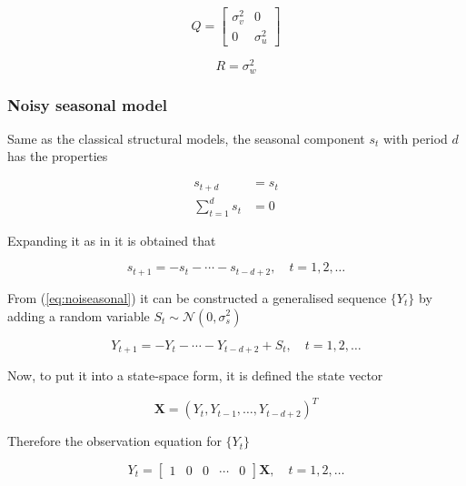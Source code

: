\begin{equation}
  Q = \begin{bmatrix}
  		\sigma^2_v 	& 0 \\
  		0 			& \sigma^2_u 
  \end{bmatrix}
\end{equation}

\begin{equation}
  R = \sigma^2_w
\end{equation}

\subsubsection*{Noisy seasonal model}

Same as the classical structural models, the seasonal component $s_t$ with period $d$ has the properties\cite{maravall1985structural}

\begin{align*}
	s_{t+d} &= s_t \\
	\sum_{t=1}^{d}{s_t} &= 0
\end{align*}

Expanding it as in \cite{brockwell2016introduction} it is obtained that

\begin{equation}\label{eq:noiseasonal}
	s_{t+1} = -s_t - \cdots - s_{t-d+2}, \quad t=1,2,\ldots
\end{equation}

From (\ref{eq:noiseasonal}) it can be constructed a generalised sequence $\{Y_t\}$ by adding a random variable $S_t \sim \mathcal{N}(0, \sigma^2_s)$

\begin{equation}
	Y_{t+1} = -Y_t - \cdots - Y_{t-d+2} + S_t, \quad t=1,2,\ldots
\end{equation} 

Now, to put it into a state-space form, it is defined the state vector

\begin{equation}
	\bm{X} = (Y_t, Y_{t-1}, \ldots, Y_{t-d+2})^T
\end{equation}

Therefore the observation equation for $\{Y_t\}$

\begin{equation}
	Y_t = \begin{bmatrix}1 & 0 & 0 & \cdots & 0\end{bmatrix} \bm{X}, \quad t=1,2,\ldots
\end{equation}


